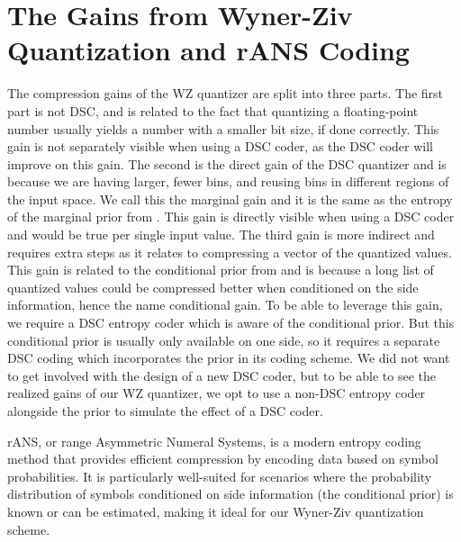 \section{The Gains from Wyner-Ziv Quantization and rANS Coding}


The compression gains of the WZ quantizer are split into three parts.
The first part is not DSC, and is related to the fact that quantizing a floating-point number usually yields a number with a smaller bit size, if done correctly. This gain is not separately visible when using a DSC coder, as the DSC coder will improve on this gain.
The second is the direct gain of the DSC quantizer and is because we are having larger, fewer bins, and reusing bins in different regions of the input space. We call this the marginal gain and it is the same as the entropy of the marginal prior from \cite{OzyilkanRecoverBinning}. This gain is directly visible when using a DSC coder and would be true per single input value.
The third gain is more indirect and requires extra steps as it relates to compressing a vector of the quantized values. This gain is related to the conditional prior from \cite{OzyilkanRecoverBinning} and is because a long list of quantized values could be compressed better when conditioned on the side information, hence the name conditional gain. To be able to leverage this gain, we require a DSC entropy coder which is aware of the conditional prior. But this conditional prior is usually only available on one side, so it requires a separate DSC coding which incorporates the prior in its coding scheme. We did not want to get involved with the design of a new DSC coder, but to be able to see the realized gains of our WZ quantizer, we opt to use a non-DSC entropy coder alongside the prior to simulate the effect of a DSC coder.

rANS, or range Asymmetric Numeral Systems, is a modern entropy coding method that provides efficient compression by encoding data based on symbol probabilities. It is particularly well-suited for scenarios where the probability distribution of symbols conditioned on side information (the conditional prior) is known or can be estimated, making it ideal for our Wyner-Ziv quantization scheme.